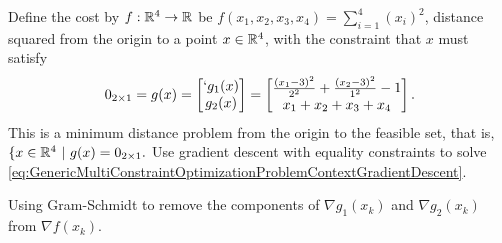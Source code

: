 \begin{example} Define the cost by $f:\mathbb R^4 \to \mathbb R$ be $f(x_1, x_2, x_3, x_4) = \sum_{i=1}^4 (x_i)^2$, distance squared from the origin to a point $x \in \mathbb R^4$, with the constraint that $x$ must satisfy
$$0_{2 \times 1}=g(x) = \begin{bmatrix}`g_1(x) \\ g_2(x)\end{bmatrix} =  \begin{bmatrix} \frac{(x_1 - 3)^2}{2^2} + \frac{(x_2 - 3)^2}{1^2} - 1\\ x_1+x_2+x_3+x_4\end{bmatrix}.$$
This is a minimum distance problem from the origin to the feasible set, that is, $\{ x \in \mathbb R^4~|~ g(x) = 0_{2 \times 1}.$ Use gradient descent with equality constraints to solve \eqref{eq:GenericMultiConstraintOptimizationProblemContextGradientDescent}.


    
\end{example}

\solution Using Gram-Schmidt to remove the components of $\nabla g_1(x_k)$ and $\nabla g_2(x_k)$ from $\nabla f(x_k)$.


